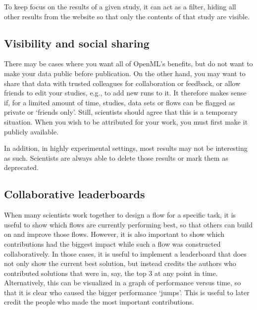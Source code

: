 \documentclass{acmproc-sp}
\begin{document}
To keep focus on the results of a given study, it can act as a filter, hiding all other results from the website so that only the contents of that study are visible.

\subsection{Visibility and social sharing}
There may be cases where you want all of OpenML's benefits, but do not want to make your data public before publication. On the other hand, you may want to share that data with trusted colleagues for collaboration or feedback, or allow friends to edit your studies, e.g., to add new runs to it. It therefore makes sense if, for a limited amount of time, studies, data sets or flows can be flagged as private or `friends only'. Still, scientists should agree that this is a temporary situation. When you wish to be attributed for your work, you must first make it publicly available. 

In addition, in highly experimental settings, most results may not be interesting as such. Scientists are always able to delete those results or mark them as deprecated.

\subsection{Collaborative leaderboards}
When many scientists work together to design a flow for a specific task, it is useful to show which flows are currently performing best, so that others can build on and improve those flows. However, it is also important to show which contributions had the biggest impact while such a flow was constructed collaboratively. In those cases, it is useful to implement a leaderboard that does not only show the current best solution, but instead credits the authors who contributed solutions that were in, say, the top 3 at any point in time. Alternatively, this can be visualized in a graph of performance versus time, so that it is clear who caused the bigger performance `jumps'. This is useful to later credit the people who made the most important contributions.




\end{document}
